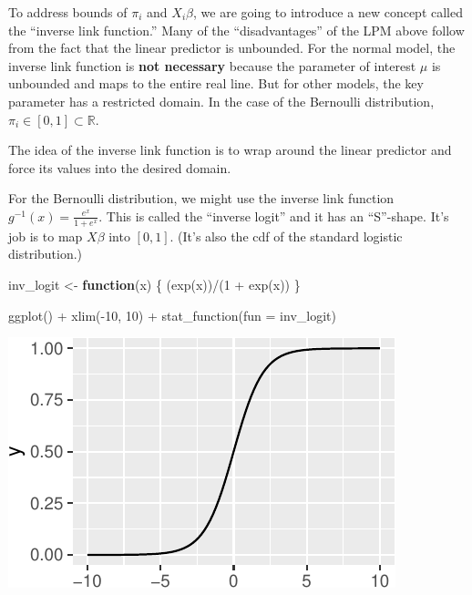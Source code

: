 \documentclass[
]{book}
\newenvironment{Shaded}{\begin{snugshade}}{\end{snugshade}}
\newcommand{\AttributeTok}[1]{\textcolor[rgb]{0.77,0.63,0.00}{#1}}
\newcommand{\ControlFlowTok}[1]{\textcolor[rgb]{0.13,0.29,0.53}{\textbf{#1}}}
\newcommand{\DecValTok}[1]{\textcolor[rgb]{0.00,0.00,0.81}{#1}}
\newcommand{\FunctionTok}[1]{\textcolor[rgb]{0.00,0.00,0.00}{#1}}
\newcommand{\NormalTok}[1]{#1}
\newcommand{\OtherTok}[1]{\textcolor[rgb]{0.56,0.35,0.01}{#1}}
\newcommand{\SpecialCharTok}[1]{\textcolor[rgb]{0.00,0.00,0.00}{#1}}
\begin{document}
To address bounds of \(\pi_i\) and \(X_i\beta\), we are going to introduce a new concept called the ``inverse link function.'' Many of the ``disadvantages'' of the LPM above follow from the fact that the linear predictor is unbounded. For the normal model, the inverse link function is \textbf{not necessary} because the parameter of interest \(\mu\) is unbounded and maps to the entire real line. But for other models, the key parameter has a restricted domain. In the case of the Bernoulli distribution, \(\pi_i \in [0, 1] \subset \mathbb{R}\).

The idea of the inverse link function is to wrap around the linear predictor and force its values into the desired domain.

For the Bernoulli distribution, we might use the inverse link function \(g^{-1}(x) = \frac{e^x}{1 + e^x}\). This is called the ``inverse logit'' and it has an ``S''-shape. It's job is to map \(X\beta\) into \([0, 1]\). (It's also the cdf of the standard logistic distribution.)

\begin{Shaded}
\begin{Highlighting}[]
\NormalTok{inv\_logit }\OtherTok{\textless{}{-}} \ControlFlowTok{function}\NormalTok{(x) \{}
\NormalTok{  (}\FunctionTok{exp}\NormalTok{(x))}\SpecialCharTok{/}\NormalTok{(}\DecValTok{1} \SpecialCharTok{+} \FunctionTok{exp}\NormalTok{(x))}
\NormalTok{\}}

\FunctionTok{ggplot}\NormalTok{() }\SpecialCharTok{+} 
  \FunctionTok{xlim}\NormalTok{(}\SpecialCharTok{{-}}\DecValTok{10}\NormalTok{, }\DecValTok{10}\NormalTok{) }\SpecialCharTok{+} 
  \FunctionTok{stat\_function}\NormalTok{(}\AttributeTok{fun =}\NormalTok{ inv\_logit)}
\end{Highlighting}
\end{Shaded}

\includegraphics{03-02-bernoulli-model_files/figure-latex/unnamed-chunk-5-1.pdf}
\end{document}
